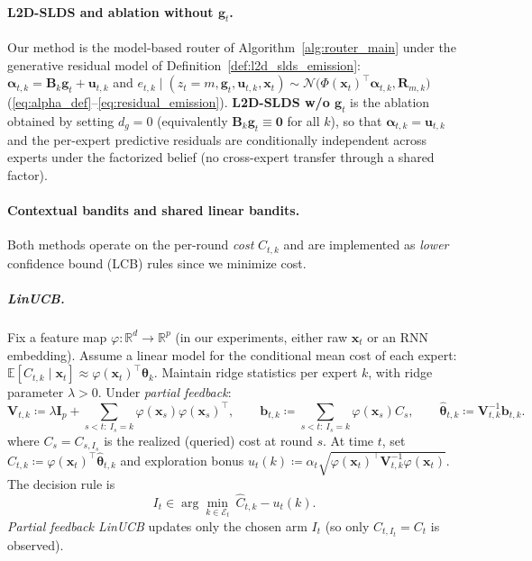 \paragraph{L2D-SLDS and ablation without \(\mathbf{g}_t\).}
Our method is the model-based router of Algorithm~\ref{alg:router_main} under the generative residual
model of Definition~\ref{def:l2d_slds_emission}:
\(
\boldsymbol{\alpha}_{t,k}=\mathbf{B}_k\mathbf{g}_t+\mathbf{u}_{t,k}
\)
and
\(
e_{t,k}\mid(z_t=m,\mathbf{g}_t,\mathbf{u}_{t,k},\mathbf{x}_t)\sim
\mathcal{N}\!\big(\Phi(\mathbf{x}_t)^\top\boldsymbol{\alpha}_{t,k},\mathbf{R}_{m,k}\big)
\)
(\eqref{eq:alpha_def}--\eqref{eq:residual_emission}).
\textbf{L2D-SLDS w/o \(\mathbf{g}_t\)} is the ablation obtained by setting \(d_g=0\) (equivalently
\(\mathbf{B}_k\mathbf{g}_t\equiv \mathbf{0}\) for all \(k\)), so that
\(\boldsymbol{\alpha}_{t,k}=\mathbf{u}_{t,k}\) and the per-expert predictive residuals are conditionally
independent across experts under the factorized belief (no cross-expert transfer through a shared
factor).

\paragraph{Contextual bandits and shared linear bandits.}
Both methods operate on the per-round \emph{cost} \(C_{t,k}\) and are implemented as \emph{lower}
confidence bound (LCB) rules since we minimize cost.


\subparagraph{LinUCB.}
Fix a feature map \(\varphi:\mathbb{R}^d\to\mathbb{R}^p\) (in our experiments, either raw
\(\mathbf{x}_t\) or an RNN embedding).
Assume a linear model for the conditional mean cost of each expert:
\(
\mathbb{E}[C_{t,k}\mid \mathbf{x}_t]\approx \varphi(\mathbf{x}_t)^\top \boldsymbol{\theta}_k
\).
Maintain ridge statistics per expert \(k\), with ridge parameter \(\lambda>0\).
Under \emph{partial feedback}:
\[
\mathbf{V}_{t,k}\coloneqq \lambda \mathbf{I}_p + \sum_{s<t:\ I_s=k} \varphi(\mathbf{x}_s)\varphi(\mathbf{x}_s)^\top,
\qquad
\mathbf{b}_{t,k}\coloneqq \sum_{s<t:\ I_s=k} \varphi(\mathbf{x}_s)C_s,
\qquad
\widehat{\boldsymbol{\theta}}_{t,k}\coloneqq \mathbf{V}_{t,k}^{-1}\mathbf{b}_{t,k}.
\]
where \(C_s=C_{s,I_s}\) is the realized (queried) cost at round \(s\).  At time \(t\), set
\(
\widehat{C}_{t,k}\coloneqq \varphi(\mathbf{x}_t)^\top\widehat{\boldsymbol{\theta}}_{t,k}
\)
and exploration bonus
\(
u_t(k)\coloneqq \alpha_t\sqrt{\varphi(\mathbf{x}_t)^\top\mathbf{V}_{t,k}^{-1}\varphi(\mathbf{x}_t)}.
\)
The decision rule is
\[
I_t \in \arg\min_{k\in\mathcal{E}_t}\ \widehat{C}_{t,k}-u_t(k).
\]
\emph{Partial feedback LinUCB} updates only the chosen arm \(I_t\) (so only \(C_{t,I_t}=C_t\) is observed).

